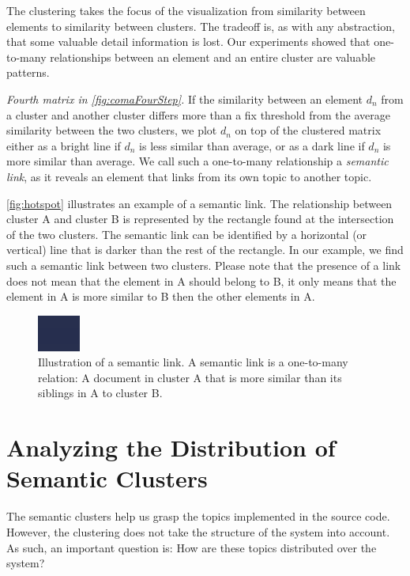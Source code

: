 \documentclass[10pt]{book}
\begin{document}
The clustering takes the focus of the visualization from similarity between elements to similarity between clusters. The tradeoff is, as with any abstraction, that some valuable detail information is lost. Our experiments showed that one-to-many relationships between an element and an entire cluster are valuable patterns.

\emph{Fourth matrix in \autoref{fig:comaFourStep}.} If the similarity between an element $d_n$ from a cluster and another cluster differs more than a fix threshold from the average similarity between the two clusters, we plot $d_n$ on top of the clustered matrix either as a bright line if $d_n$ is less similar than average, or as a dark line if $d_n$ is more similar than average. We call such a one-to-many relationship a \emph{semantic link}, as it reveals an element that links from its own topic to another topic.

\autoref{fig:hotspot} illustrates an example of a semantic link. The relationship between cluster A and cluster B is represented by the rectangle found at the intersection of the two clusters. The semantic link can be identified by a horizontal (or vertical) line that is darker than the rest of the rectangle. In our example, we find such a semantic link between two clusters. Please note that the presence of a link does not mean that the element in A should belong to B, it only means that the element in A is more similar to B then the other elements in A.

\begin{figure}[h]
    \centering
  \includegraphics{hotspot}
  \caption{Illustration of a semantic link. A semantic link is a one-to-many relation: A document in cluster A that is more similar than its siblings in A to cluster B.}\label{fig:hotspot}
\end{figure}

\section{Analyzing the Distribution of Semantic Clusters}\label{sec:distribution}

The semantic clusters help us grasp the topics implemented in the source code. However, the clustering does not take the structure of the system into account. As such, an important question is: How are these topics distributed over the system?
\end{document}
